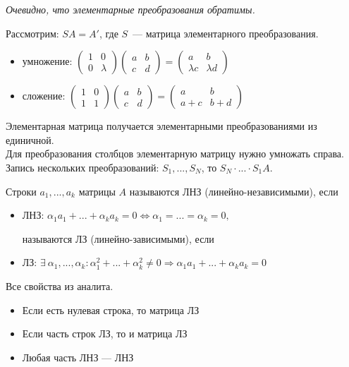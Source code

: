 \emph{Очевидно, что элементарные преобразования обратимы.}

Рассмотрим: $SA=A'$, где $S$~--- матрица элементарного преобразования.
\begin{itemize}
	\item умножение: $\begin{pmatrix}
	1 & 0 \\ 0 & \lambda
	\end{pmatrix}
	\begin{pmatrix}
	a & b \\ c & d
	\end{pmatrix}=
	\begin{pmatrix}
	a & b \\ \lambda c & \lambda d
	\end{pmatrix}$
	\item сложение: $\begin{pmatrix}
	1 & 0 \\ 1 & 1
	\end{pmatrix}
	\begin{pmatrix}
	a & b \\ c & d
	\end{pmatrix}=
	\begin{pmatrix}
	a & b \\ a + c & b + d
	\end{pmatrix}$
\end{itemize}
Элементарная матрица получается элементарными преобразованиями из единичной.\\
Для преобразования столбцов элементарную матрицу нужно умножать справа.\\
Запись нескольких преобразований: $S_1,...,S_N$, то $S_N \cdot ... \cdot S_1 A$.

Строки $a_1,...,a_k$ матрицы $A$ называются ЛНЗ (линейно-независимыми), если
\begin{itemize}
	\item ЛНЗ: $\alpha_1 a_1+...+\alpha_k a_k = 0 \Leftrightarrow \alpha_1=...=\alpha_k=0,$
	
	называются ЛЗ (линейно-зависимыми), если
	\item ЛЗ: $\exists\ \alpha_1,...,\alpha_k: \alpha_1^2+...+\alpha_k^2 \neq 0 \Rightarrow \alpha_1 a_1+...+\alpha_k a_k = 0$
\end{itemize}

Все свойства из аналита.
\begin{itemize}
	\item Если есть нулевая строка, то матрица ЛЗ
	\item Если часть строк ЛЗ, то и матрица ЛЗ
	\item Любая часть ЛНЗ --- ЛНЗ
\end{itemize}

